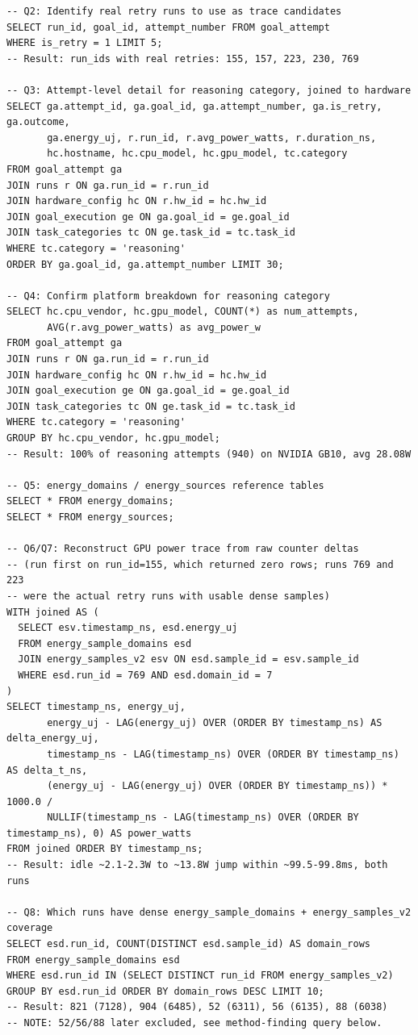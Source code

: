 \documentclass[10pt]{article}
\begin{document}
\begin{lstlisting}
-- Q2: Identify real retry runs to use as trace candidates
SELECT run_id, goal_id, attempt_number FROM goal_attempt
WHERE is_retry = 1 LIMIT 5;
-- Result: run_ids with real retries: 155, 157, 223, 230, 769

-- Q3: Attempt-level detail for reasoning category, joined to hardware
SELECT ga.attempt_id, ga.goal_id, ga.attempt_number, ga.is_retry, ga.outcome,
       ga.energy_uj, r.run_id, r.avg_power_watts, r.duration_ns,
       hc.hostname, hc.cpu_model, hc.gpu_model, tc.category
FROM goal_attempt ga
JOIN runs r ON ga.run_id = r.run_id
JOIN hardware_config hc ON r.hw_id = hc.hw_id
JOIN goal_execution ge ON ga.goal_id = ge.goal_id
JOIN task_categories tc ON ge.task_id = tc.task_id
WHERE tc.category = 'reasoning'
ORDER BY ga.goal_id, ga.attempt_number LIMIT 30;

-- Q4: Confirm platform breakdown for reasoning category
SELECT hc.cpu_vendor, hc.gpu_model, COUNT(*) as num_attempts,
       AVG(r.avg_power_watts) as avg_power_w
FROM goal_attempt ga
JOIN runs r ON ga.run_id = r.run_id
JOIN hardware_config hc ON r.hw_id = hc.hw_id
JOIN goal_execution ge ON ga.goal_id = ge.goal_id
JOIN task_categories tc ON ge.task_id = tc.task_id
WHERE tc.category = 'reasoning'
GROUP BY hc.cpu_vendor, hc.gpu_model;
-- Result: 100% of reasoning attempts (940) on NVIDIA GB10, avg 28.08W

-- Q5: energy_domains / energy_sources reference tables
SELECT * FROM energy_domains;
SELECT * FROM energy_sources;

-- Q6/Q7: Reconstruct GPU power trace from raw counter deltas
-- (run first on run_id=155, which returned zero rows; runs 769 and 223
-- were the actual retry runs with usable dense samples)
WITH joined AS (
  SELECT esv.timestamp_ns, esd.energy_uj
  FROM energy_sample_domains esd
  JOIN energy_samples_v2 esv ON esd.sample_id = esv.sample_id
  WHERE esd.run_id = 769 AND esd.domain_id = 7
)
SELECT timestamp_ns, energy_uj,
       energy_uj - LAG(energy_uj) OVER (ORDER BY timestamp_ns) AS delta_energy_uj,
       timestamp_ns - LAG(timestamp_ns) OVER (ORDER BY timestamp_ns) AS delta_t_ns,
       (energy_uj - LAG(energy_uj) OVER (ORDER BY timestamp_ns)) * 1000.0 /
       NULLIF(timestamp_ns - LAG(timestamp_ns) OVER (ORDER BY timestamp_ns), 0) AS power_watts
FROM joined ORDER BY timestamp_ns;
-- Result: idle ~2.1-2.3W to ~13.8W jump within ~99.5-99.8ms, both runs

-- Q8: Which runs have dense energy_sample_domains + energy_samples_v2 coverage
SELECT esd.run_id, COUNT(DISTINCT esd.sample_id) AS domain_rows
FROM energy_sample_domains esd
WHERE esd.run_id IN (SELECT DISTINCT run_id FROM energy_samples_v2)
GROUP BY esd.run_id ORDER BY domain_rows DESC LIMIT 10;
-- Result: 821 (7128), 904 (6485), 52 (6311), 56 (6135), 88 (6038)
-- NOTE: 52/56/88 later excluded, see method-finding query below.


\end{lstlisting}
\end{document}
